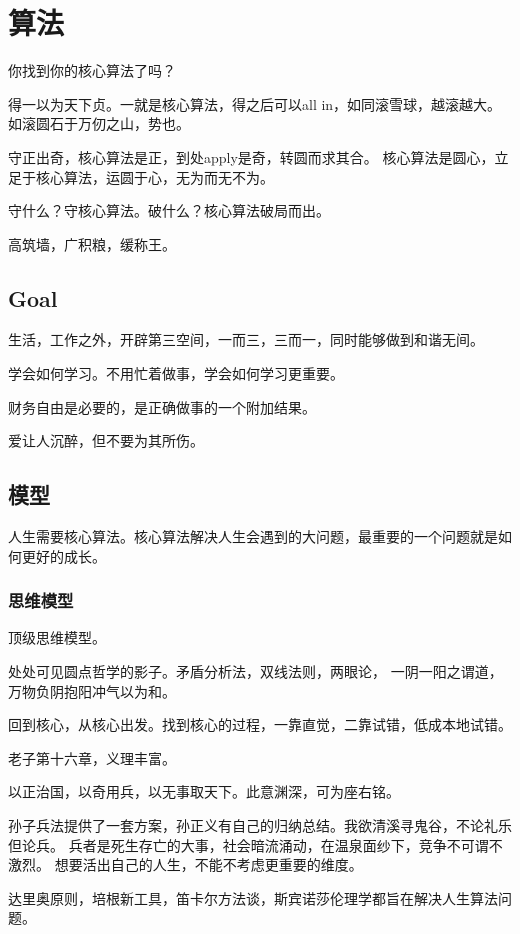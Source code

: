 \chapter{算法}

你找到你的核心算法了吗？

得一以为天下贞。一就是核心算法，得之后可以all in，如同滚雪球，越滚越大。
如滚圆石于万仞之山，势也。

守正出奇，核心算法是正，到处apply是奇，转圆而求其合。
核心算法是圆心，立足于核心算法，运圆于心，无为而无不为。

守什么？守核心算法。破什么？核心算法破局而出。

高筑墙，广积粮，缓称王。

\section{Goal}

生活，工作之外，开辟第三空间，一而三，三而一，同时能够做到和谐无间。

学会如何学习。不用忙着做事，学会如何学习更重要。

财务自由是必要的，是正确做事的一个附加结果。

爱让人沉醉，但不要为其所伤。

\section{模型}

人生需要核心算法。核心算法解决人生会遇到的大问题，最重要的一个问题就是如何更好的成长。

\subsection{思维模型}

顶级思维模型。

处处可见圆点哲学的影子。矛盾分析法，双线法则，两眼论，
一阴一阳之谓道，万物负阴抱阳冲气以为和。

回到核心，从核心出发。找到核心的过程，一靠直觉，二靠试错，低成本地试错。

老子第十六章，义理丰富。

以正治国，以奇用兵，以无事取天下。此意渊深，可为座右铭。

孙子兵法提供了一套方案，孙正义有自己的归纳总结。我欲清溪寻鬼谷，不论礼乐但论兵。
兵者是死生存亡的大事，社会暗流涌动，在温泉面纱下，竞争不可谓不激烈。
想要活出自己的人生，不能不考虑更重要的维度。

达里奥原则，培根新工具，笛卡尔方法谈，斯宾诺莎伦理学都旨在解决人生算法问题。

